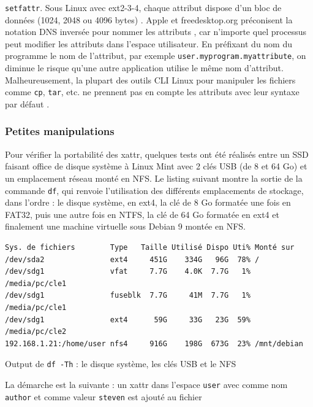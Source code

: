 \documentclass[a4paper, 12pt]{article}
\newenvironment{code}{\captionsetup{type=listing}}{}
\begin{document}
\texttt{setfattr}. Sous Linux avec ext2-3-4, chaque attribut dispose d'un bloc de données 
(1024, 2048 ou 4096 bytes) \cite{ref12}.
Apple et freedesktop.org préconisent la notation DNS inversée pour 
nommer les attributs \cite{ref8}, \cite{ref24} car n'importe quel processus peut modifier les 
attributs dans l'espace utilisateur. En préfixant du nom du programme le nom de l'attribut, par 
exemple \texttt{user.myprogram.myattribute}, on diminue le risque qu'une autre 
application utilise le même nom d'attribut. Malheureusement, la plupart des outils CLI Linux 
pour manipuler les fichiers comme \texttt{cp}, \texttt{tar}, etc. ne prennent 
pas en compte les attributs avec leur syntaxe par défaut \cite{ref4}.

\subsubsection{Petites manipulations}
Pour vérifier la portabilité des \acrshort{xattr}, quelques tests ont été réalisés entre un 
SSD faisant office de disque système à Linux Mint avec 2 clés USB (de 8 et 64 Go) et un emplacement 
réseau monté en NFS. Le listing suivant montre la sortie de la commande \texttt{df}, qui 
renvoie l'utilisation des différents emplacements de stockage, dans l'ordre : le disque système, en 
ext4, la clé de 8 Go formatée une fois en FAT32, puis une autre fois en NTFS, la clé de 64 Go formatée 
en ext4 et finalement une machine virtuelle sous Debian 9 montée en NFS.
\bigbreak
\begin{code}
    \begin{verbatim}
Sys. de fichiers        Type   Taille Utilisé Dispo Uti% Monté sur
/dev/sda2               ext4     451G    334G   96G  78% /
/dev/sdg1               vfat     7.7G    4.0K  7.7G   1% /media/pc/cle1
/dev/sdg1               fuseblk  7.7G     41M  7.7G   1% /media/pc/cle1
/dev/sdg1               ext4      59G     33G   23G  59% /media/pc/cle2
192.168.1.21:/home/user nfs4     916G    198G  673G  23% /mnt/debian
    \end{verbatim}
    \caption{Output de \texttt{df -Th} : le disque système, les clés USB et le NFS}
\end{code}
\bigbreak
La démarche est la suivante : un \acrshort{xattr} dans l'espace \texttt{user} avec 
comme nom \texttt{author} et comme valeur \texttt{steven} est ajouté au fichier 
\end{document}
